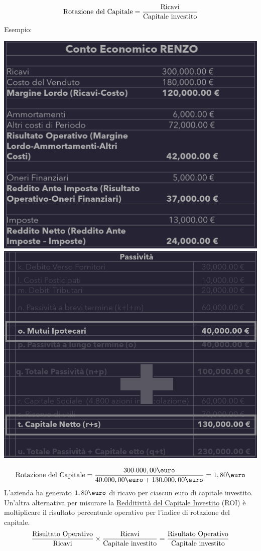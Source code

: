\documentclass{article}
\begin{document}
\[
    \text{Rotazione del Capitale} = \frac{\text{Ricavi}}{\text{Capitale investito}}
\]
Esempio:
\begin{center}
    \includegraphics[scale=0.3]{Image/RotCapitale_1.png}
    \includegraphics[scale=0.3]{Image/RotCapitale_2.png}
\end{center}
\[
    \T{Rotazione del Capitale} = \frac{300.000,00\T{\euro}}{40.000,00\T{\euro}+ 130.000,00 \T{\euro}} = 1,80 \T{\euro}
\]
L'azienda ha generato $1,80 \T{\euro}$ di ricavo per ciascun euro di capitale investito.
\vspace*{0.2cm}\\
Un'altra alternativa per misurare la \underline{Redditività del Capitale Investito} (ROI) è moltiplicare il risultato percentuale operativo per l'indice di rotazione del capitale.
\[
    \frac{\text{Risultato Operativo}}{\text{Ricavi}} \times \frac{\text{Ricavi}}{\text{Capitale investito}} = \frac{\text{Risultato Operativo}}{\text{Capitale investito}}
\]
\end{document}
